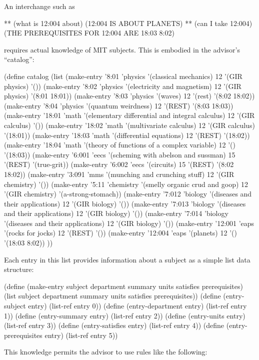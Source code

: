 An interchange such as

\beginlisp
** (what is 12:004 about)
(12:004 IS ABOUT PLANETS)
** (can I take 12:004)
(THE PREREQUISITES FOR 12:004 ARE 18:03 8:02)
\endlisp

\noindent
requires actual knowledge of MIT subjects.  This is embodied in the
advisor's ``catalog'':

\beginlisp
(define catalog
  (list 
   (make-entry '8:01 'physics '(classical mechanics) 12 '(GIR physics) '())
   (make-entry '8:02 'physics '(electricity and magnetism) 12 '(GIR physics) '(8:01 18:01))
   (make-entry '8:03 'physics '(waves) 12 '(rest) '(8:02 18:02))
   (make-entry '8:04 'physics '(quantum weirdness) 12 '(REST) '(8:03 18:03))
   (make-entry '18:01 'math '(elementary differential and integral calculus) 12 '(GIR calculus) '())
   (make-entry '18:02 'math '(multivariate calculus) 12 '(GIR calculus) '(18:01)) 
   (make-entry '18:03 'math '(differential equations) 12 '(REST) '(18:02))
   (make-entry '18:04 'math '(theory of functions of a complex variable) 12 '() '(18:03))
   (make-entry '6:001 'eecs '(scheming with abelson and sussman) 15 '(REST) '(true-grit))
   (make-entry '6:002 'eecs '(circuits) 15 '(REST) '(8:02 18:02))
   (make-entry '3:091 'mms '(munching and crunching stuff) 12 '(GIR chemistry) '())
   (make-entry '5:11 'chemistry '(smelly organic crud and goop) 12 '(GIR chemistry) '(a-strong-stomach))
   (make-entry '7:012 'biology '(diseases and their applications) 12 '(GIR biology) '())
   (make-entry '7:013 'biology '(diseases and their applications) 12 '(GIR biology) '())
   (make-entry '7:014 'biology '(diseases and their applications) 12 '(GIR biology) '())
   (make-entry '12:001 'eaps '(rocks for jocks) 12 '(REST) '())
   (make-entry '12:004 'eaps '(planets) 12 '() '(18:03 8:02)) ))
\endlisp

\noindent
Each entry in this list provides information about a subject as a
simple list data structure:

\beginlisp
(define (make-entry subject department summary units satisfies prerequisites)
  (list subject department summary units satisfies prerequisites))
\null
(define (entry-subject entry) (list-ref entry 0))
(define (entry-department entry) (list-ref entry 1))
(define (entry-summary entry) (list-ref entry 2))
(define (entry-units entry) (list-ref entry 3))
(define (entry-satisfies entry) (list-ref entry 4))
(define (entry-prerequisites entry) (list-ref entry 5))
\endlisp

This knowledge permits the advisor to use rules like the following:

